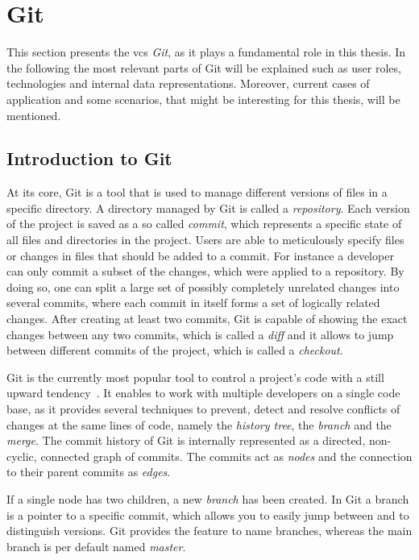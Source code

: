 \section{Git}\label{git-explanation}
This section presents the \ac{vcs} \emph{Git}, as it plays a fundamental role in this thesis.
In the following the most relevant parts of Git will be explained such as user roles, technologies and internal data representations.
Moreover, current cases of application and some scenarios, that might be interesting for this thesis, will be mentioned.


\subsection{Introduction to Git}\label{git-introduction}
At its core, Git is a tool that is used to manage different versions of files in a specific directory.
A directory managed by Git is called a \emph{repository}.
Each version of the project is saved as a so called \emph{commit}, which represents a specific state of all files and directories in the project.
Users are able to meticulously specify files or changes in files that should be added to a commit.
For instance a developer can only commit a subset of the changes, which were applied to a repository.
By doing so, one can split a large set of possibly completely unrelated changes into several commits, where each commit in itself forms a set of logically related changes.
After creating at least two commits, Git is capable of showing the exact changes between any two commits, which is called a \emph{diff} and it allows to jump between different commits of the project, which is called a \emph{checkout}.

Git is the currently most popular tool to control a project's code with a still upward tendency~\cite{article:git-popularity}.
It enables to work with multiple developers on a single code base, as it provides several techniques to prevent, detect and resolve conflicts of changes at the same lines of code, namely the \emph{history tree}, the \emph{branch} and the \emph{merge}.
The commit history of Git is internally represented as a directed, non-cyclic, connected graph of commits.
The commits act as \emph{nodes} and the connection to their parent commits as \emph{edges}.

If a single node has two children, a new \emph{branch} has been created.
In Git a branch is a pointer to a specific commit, which allows you to easily jump between and to distinguish versions.
Git provides the feature to name branches, whereas the main branch is per default named \emph{master}.

